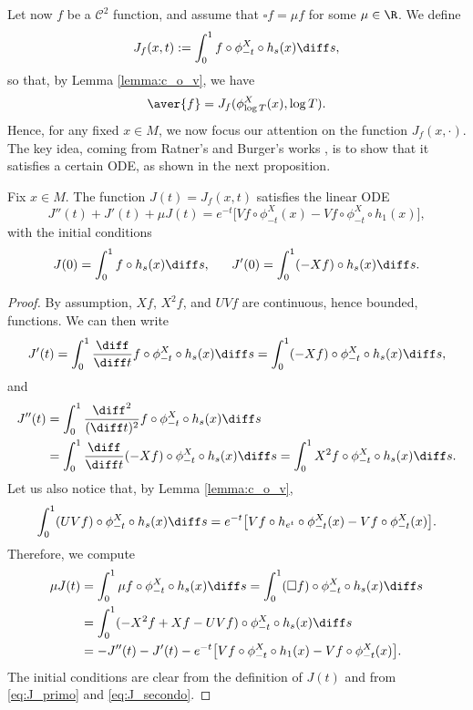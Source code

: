 Let now $f$ be a $\mathscr{C}^2$ function, and assume that $\square f = \mu f$ for some $\mu \in \R$.
We define
\[
J_f(x,t) := \int_0^1 f \circ \phi^X_{-t}\circ h_s(x) \diff s,
\]
so that, by Lemma \ref{lemma:c_o_v}, we have
\begin{equation}\label{eq:aver_equals_I}
\aver{f} = J_f(\phi^X_{\log T}(x), \log T).
\end{equation}
Hence, for any fixed $x \in M$, we now focus our attention on the function $J_f(x, \cdot)$.
The key idea, coming from Ratner's and Burger's works \cite{Rat1, Bur}, is to show that it satisfies a certain ODE, as shown in the next proposition.

\begin{proposition}\label{thm:eq_diff}
Fix $x \in M$. The function $J(t) = J_f(x,t) $ satisfies the linear ODE
\begin{equation*}
J''(t)+J'(t)+ \mu J(t) = e^{-t} \bigl[ Vf \circ \phi^X_{-t}(x) - Vf \circ \phi^X_{-t} \circ h_1(x) \bigr],
\end{equation*}
with the initial conditions
\[
J(0) = \int_0^1 f \circ h_s(x) \diff s,\ \ \ \ \ J'(0) = \int_0^1 (-Xf) \circ h_s(x) \diff s.
\]
\end{proposition}
\begin{proof}
By assumption, $Xf$, $X^2f$, and $UVf$ are continuous, hence bounded, functions.
We can then write
\begin{equation}\label{eq:J_primo}
J'(t) = \int_0^1 \frac{\diff}{\diff t} f\circ \phi^X_{-t}\circ h_s(x) \diff s = \int_0^1 (-Xf) \circ \phi^X_{-t}\circ h_s(x) \diff s,
\end{equation}
and
\begin{equation}\label{eq:J_secondo}
\begin{split}
J''(t) &= \int_0^1 \frac{\diff^2}{(\diff t)^2} f\circ \phi^X_{-t}\circ h_s(x) \diff s\\
&= \int_0^1 \frac{\diff}{\diff t} (-Xf)\circ \phi^X_{-t}\circ h_s(x) \diff s = \int_0^1 X^2f \circ \phi^X_{-t}\circ h_s(x) \diff s.
\end{split}
\end{equation}
Let us also notice that, by Lemma \ref{lemma:c_o_v},
\[
\int_0^1 (UVf) \circ \phi^X_{-t}\circ h_s(x) \diff s = e^{-t}\bigl[ Vf\circ h_{e^t} \circ \phi^X_{-t}(x) - Vf \circ \phi^X_{-t}(x)\bigr].
\]
Therefore, we compute
\begin{equation*}
\begin{split}
\mu J(t) &= \int_0^1 \mu f \circ \phi^X_{-t}\circ h_s(x) \diff s = \int_0^1 (\square f) \circ \phi^X_{-t}\circ h_s(x) \diff s \\
&= \int_0^1 (-X^2f+Xf -UVf) \circ \phi^X_{-t}\circ h_s(x) \diff s \\
&= - J''(t) -J'(t) - e^{-t}\bigl[ Vf \circ \phi^X_{-t}\circ h_{1}(x) - Vf \circ \phi^X_{-t}(x)\bigr].
\end{split}
\end{equation*}
The initial conditions are clear from the definition of $J(t)$ and from \eqref{eq:J_primo} and \eqref{eq:J_secondo}.
\end{proof}

